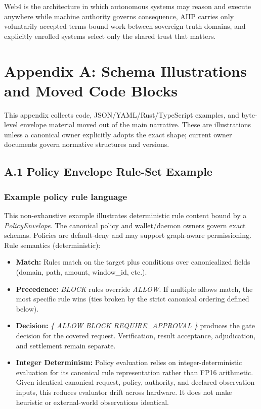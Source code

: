 \documentclass[
  11pt,
]{article}
\providecommand{\tightlist}{%
  \setlength{\itemsep}{0pt}\setlength{\parskip}{0pt}}
\begin{document}
Web4 is the architecture in which autonomous systems may reason and execute
anywhere while machine authority governs consequence, AIIP carries only
voluntarily accepted terms-bound work between sovereign truth domains, and
explicitly enrolled systems select only the shared trust that matters.

\hypertarget{appendix-a-normative-schemas-and-moved-code-blocks}{%
\section{Appendix A: Schema Illustrations and Moved Code
Blocks}\label{appendix-a-normative-schemas-and-moved-code-blocks}}

This appendix collects code, JSON/YAML/Rust/TypeScript examples, and
byte-level envelope material moved out of the main narrative. These are
illustrations unless a canonical owner explicitly adopts the exact shape;
current owner documents govern normative structures and versions.

\hypertarget{a.1-actionrules-policy-example}{%
\subsection{A.1 Policy Envelope Rule-Set Example}\label{a.1-actionrules-policy-example}}

\hypertarget{actionrules-the-policy-language-1}{%
\subsubsection{Example policy rule
language}\label{actionrules-the-policy-language-1}}

This non-exhaustive example illustrates deterministic rule content bound by
a \emph{PolicyEnvelope}. The canonical policy and wallet/daemon owners govern
exact schemas. Policies are default-deny and may support graph-aware
permissioning.\\

Rule semantics (deterministic):

\begin{itemize}
\tightlist
\item
  \textbf{Match:} Rules match on the target plus conditions over
  canonicalized fields (domain, path, amount, window\_id, etc.).
\item
  \textbf{Precedence:} \emph{BLOCK} rules override \emph{ALLOW}. If
  multiple allows match, the most specific rule wins (ties broken by the
  strict canonical ordering defined below).
\item
  \textbf{Decision:} \emph{\{ ALLOW \textbar{} BLOCK \textbar{}
  REQUIRE\_APPROVAL \}} produces the gate decision for the covered request.
  Verification, result acceptance, adjudication, and settlement remain separate.
\item
  \textbf{Integer Determinism:} Policy evaluation relies on
  integer-deterministic evaluation for its canonical rule representation rather
  than FP16 arithmetic. Given identical canonical request, policy, authority,
  and declared observation inputs, this reduces evaluator drift across hardware.
  It does not make heuristic or external-world observations identical.
\end{itemize}
\end{document}
